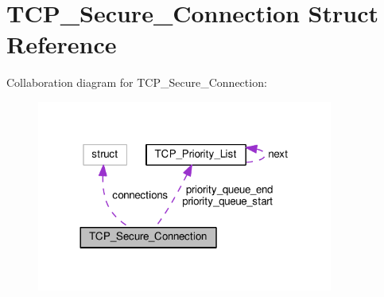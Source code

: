 \hypertarget{struct_t_c_p___secure___connection}{\section{T\+C\+P\+\_\+\+Secure\+\_\+\+Connection Struct Reference}
\label{struct_t_c_p___secure___connection}
}


Collaboration diagram for T\+C\+P\+\_\+\+Secure\+\_\+\+Connection\+:
\nopagebreak
\begin{figure}[H]
\begin{center}
\leavevmode
\includegraphics[width=276pt]{struct_t_c_p___secure___connection__coll__graph}
\end{center}
\end{figure}
